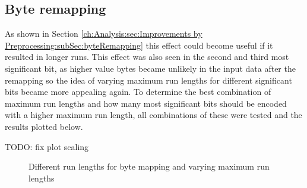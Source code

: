 \subsection{Byte remapping}
\par{
As shown in Section \ref{ch:Analysis:sec:Improvements by Preprocessing:subSec:byteRemapping} this effect could become useful if it resulted in longer runs. This effect was also seen in the second and third most significant bit, as higher value bytes became unlikely in the input data after the remapping so the idea of varying maximum run lengths for different significant bits became more appealing again. To determine the best combination of maximum run lengths and how many most significant bits should be encoded with a higher maximum run length, all combinations of these were tested and the results plotted below.
}

TODO: fix plot scaling

\begin{figure}[H]
\caption{Different run lengths for byte mapping and varying maximum run lengths}
\label{fig:2:different run lengths for byte mapping and varying maximum run lengths}
\end{figure}

